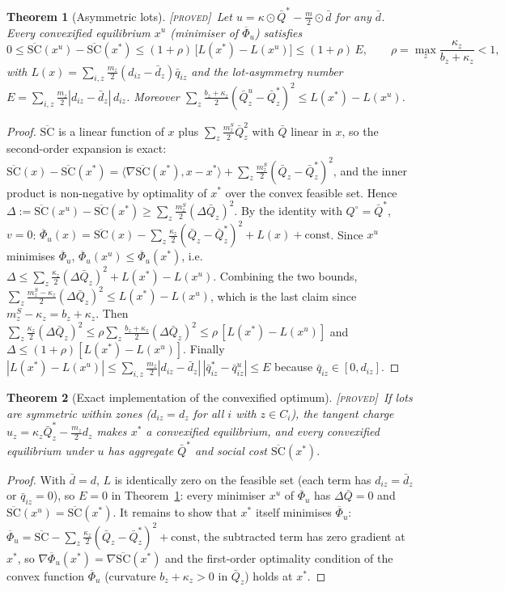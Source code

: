 \documentclass[11pt]{article}
\newtheorem{theorem}{Theorem}
\theoremstyle{definition}
\theoremstyle{remark}
\newcommand{\ip}[2]{\langle #1,#2\rangle}
\newcommand{\Qbar}{\bar Q}
\newcommand{\dbar}{\bar d}
\newcommand{\SCbar}{\overline{\mathrm{SC}}}
\newcommand{\Phibar}{\overline{\Phi}}
\newcommand{\PROVED}{{\normalfont\textsc{[proved]}}}
\begin{document}
\begin{theorem}[Asymmetric lots]\label{thm:asym}\PROVED\
Let $u=\kappa\odot\Qbar^*-\tfrac{m}{2}\odot\dbar$ for any $\dbar$. Every convexified equilibrium $x^u$ (minimiser of $\Phibar_u$) satisfies
\[0\le\SCbar(x^u)-\SCbar(x^*)\le(1+\rho)\,\big[L(x^*)-L(x^u)\big]\le(1+\rho)\,E,\qquad \rho=\max_z\frac{\kappa_z}{b_z+\kappa_z}<1,\]
with $L(x)=\sum_{i,z}\tfrac{m_z}{2}(d_{iz}-\dbar_z)\bar q_{iz}$ and the lot-asymmetry number $E=\sum_{i,z}\tfrac{m_z}{2}|d_{iz}-\dbar_z|\,d_{iz}$. Moreover $\sum_z\tfrac{b_z+\kappa_z}{2}(\Qbar^u_z-\Qbar^*_z)^2\le L(x^*)-L(x^u)$.
\end{theorem}
\begin{proof}
$\SCbar$ is a linear function of $x$ plus $\sum_z\tfrac{m^S_z}{2}\Qbar_z^2$ with $\Qbar$ linear in $x$, so the second-order expansion is exact:
$\SCbar(x)-\SCbar(x^*)=\ip{\nabla\SCbar(x^*)}{x-x^*}+\sum_z\tfrac{m^S_z}{2}(\Qbar_z-\Qbar^*_z)^2$, and the inner product is non-negative by optimality of $x^*$ over the convex feasible set. Hence
$\Delta:=\SCbar(x^u)-\SCbar(x^*)\ge\sum_z\tfrac{m^S_z}{2}(\Delta\Qbar_z)^2$.
By the identity with $Q^\circ=\Qbar^*$, $v=0$: $\Phibar_u(x)=\SCbar(x)-\sum_z\tfrac{\kappa_z}{2}(\Qbar_z-\Qbar^*_z)^2+L(x)+\text{const}$. Since $x^u$ minimises $\Phibar_u$, $\Phibar_u(x^u)\le\Phibar_u(x^*)$, i.e.\
$\Delta\le\sum_z\tfrac{\kappa_z}{2}(\Delta\Qbar_z)^2+L(x^*)-L(x^u)$.
Combining the two bounds, $\sum_z\tfrac{m^S_z-\kappa_z}{2}(\Delta\Qbar_z)^2\le L(x^*)-L(x^u)$, which is the last claim since $m^S_z-\kappa_z=b_z+\kappa_z$. Then $\sum_z\tfrac{\kappa_z}{2}(\Delta\Qbar_z)^2\le\rho\sum_z\tfrac{b_z+\kappa_z}{2}(\Delta\Qbar_z)^2\le\rho\,[L(x^*)-L(x^u)]$ and $\Delta\le(1+\rho)[L(x^*)-L(x^u)]$. Finally $|L(x^*)-L(x^u)|\le\sum_{i,z}\tfrac{m_z}{2}|d_{iz}-\dbar_z|\,|\bar q^*_{iz}-\bar q^u_{iz}|\le E$ because $\bar q_{iz}\in[0,d_{iz}]$.
\end{proof}

\begin{theorem}[Exact implementation of the convexified optimum]\label{thm:convex}\PROVED\
If lots are symmetric within zones ($d_{iz}=d_z$ for all $i$ with $z\in C_i$), the tangent charge $u_z=\kappa_z\Qbar^*_z-\tfrac{m_z}{2}d_z$ makes $x^*$ a convexified equilibrium, and \emph{every} convexified equilibrium under $u$ has aggregate $\Qbar^*$ and social cost $\SCbar(x^*)$.
\end{theorem}
\begin{proof}
With $\dbar=d$, $L$ is identically zero on the feasible set (each term has $d_{iz}=\dbar_z$ or $\bar q_{iz}=0$), so $E=0$ in Theorem~\ref{thm:asym}: every minimiser $x^u$ of $\Phibar_u$ has $\Delta\Qbar=0$ and $\SCbar(x^u)=\SCbar(x^*)$. It remains to show that $x^*$ itself minimises $\Phibar_u$: $\Phibar_u=\SCbar-\sum_z\tfrac{\kappa_z}{2}(\Qbar_z-\Qbar^*_z)^2+\text{const}$, the subtracted term has zero gradient at $x^*$, so $\nabla\Phibar_u(x^*)=\nabla\SCbar(x^*)$ and the first-order optimality condition of the convex function $\Phibar_u$ (curvature $b_z+\kappa_z>0$ in $\Qbar_z$) holds at $x^*$.
\end{proof}
\end{document}
